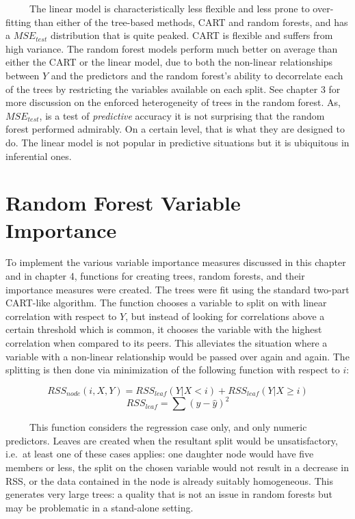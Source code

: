 \documentclass[12pt,twoside]{reedthesis}
\begin{document}
  ~~~~~The linear model is characteristically less flexible and less prone
  to over-fitting than either of the tree-based methods, CART and random
  forests, and has a \(MSE_{test}\) distribution that is quite peaked.
  CART is flexible and suffers from high variance. The random forest
  models perform much better on average than either the CART or the linear
  model, due to both the non-linear relationships between \(Y\) and the
  predictors and the random forest's ability to decorrelate each of the
  trees by restricting the variables available on each split. See chapter
  3 for more discussion on the enforced heterogeneity of trees in the
  random forest. As, \(MSE_{test}\), is a test of \emph{predictive}
  accuracy it is not surprising that the random forest performed
  admirably. On a certain level, that is what they are designed to do. The
  linear model is not popular in predictive situations but it is
  ubiquitous in inferential ones.
  
  \chapter{Random Forest Variable
  Importance}\label{random-forest-variable-importance}
  
  To implement the various variable importance measures discussed in this
  chapter and in chapter 4, functions for creating trees, random forests,
  and their importance measures were created. The trees were fit using the
  standard two-part CART-like algorithm. The function chooses a variable
  to split on with linear correlation with respect to \(Y\), but instead
  of looking for correlations above a certain threshold which is common,
  it chooses the variable with the highest correlation when compared to
  its peers. This alleviates the situation where a variable with a
  non-linear relationship would be passed over again and again. The
  splitting is then done via minimization of the following function with
  respect to \(i\):
  
  \[RSS_{node} (i,X,Y) = RSS_{leaf}(Y|X <i) + RSS_{leaf}(Y|X \geq i) \]
  \[RSS_{leaf} = \sum (y - \hat{y})^2 \]
  
  ~~~~~This function considers the regression case only, and only numeric
  predictors. Leaves are created when the resultant split would be
  unsatisfactory, i.e.~at least one of these cases applies: one daughter
  node would have five members or less, the split on the chosen variable
  would not result in a decrease in RSS, or the data contained in the node
  is already suitably homogeneous. This generates very large trees: a
  quality that is not an issue in random forests but may be problematic in
  a stand-alone setting.
  
\end{document}
